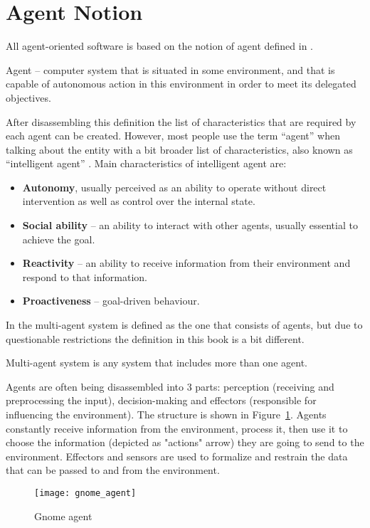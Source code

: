 \section{Agent Notion}

All agent-oriented software is based on the notion of agent defined in \cite{DUMMY:1}. \par
\theoremstyle{definition}
\begin{definition}{Agent}
    -- computer system that is situated in some environment, and that is capable of autonomous action in this environment in order to meet its delegated objectives.
\end{definition}
After disassembling this definition the list of characteristics that are required by each agent can be created. However, most people use the term ``agent'' when talking about the entity with a bit broader list of characteristics, also known as ``intelligent agent'' \cite{DUMMY:6}. Main characteristics of intelligent agent are:
\begin{itemize}
 \item \textbf{Autonomy}, usually perceived as an ability to operate without direct intervention as well as control over the internal state.
 \item \textbf{Social ability} -- an ability to interact with other agents, usually essential to achieve the goal.
 \item \textbf{Reactivity} -- an ability to receive information from their environment and respond to that information.
 \item \textbf{Proactiveness} -- goal-driven behaviour.
\end{itemize}
In \cite{dummy:1} the multi-agent system is defined as the one that consists of agents, but due to questionable restrictions the definition in this book is a bit different.
\begin{definition}{Multi-agent system}
is any system that includes more than one agent.
\end{definition}
Agents are often being disassembled into 3 parts: perception (receiving and preprocessing the input), decision-making and effectors (responsible for influencing the environment). The structure is shown in Figure~\ref{GnomeAgent}. Agents constantly receive information from the environment, process it, then use it to choose the information (depicted as "actions" arrow) they are going to send to the environment. Effectors and sensors are used to formalize and restrain the data that can be passed to and from the environment. \par
    \begin{figure}[h!]
     \begin{center}
      \texttt{[image: gnome\_agent]}
      \caption{Gnome agent}
      \label{GnomeAgent}
      \end{center}
    \end{figure}

